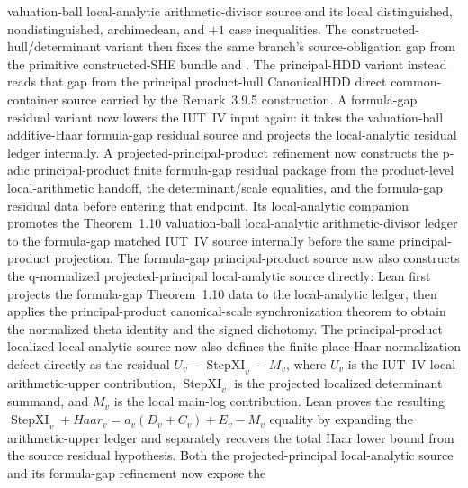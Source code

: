 \documentclass[11pt]{article}
\newcommand{\IUT}{IUT}
\theoremstyle{plain}
\theoremstyle{definition}
\theoremstyle{remark}
\begin{document}
valuation-ball local-analytic arithmetic-divisor source and its local
distinguished, nondistinguished, archimedean, and \(+1\) case inequalities.
The constructed-hull/determinant variant
\texttt{}
then fixes the same branch's source-obligation gap from the primitive
constructed-SHE bundle and
\texttt{}.
The principal-HDD variant
\texttt{}
instead reads that gap from the principal product-hull CanonicalHDD direct
common-container source carried by the Remark~3.9.5 construction.
A formula-gap residual variant now lowers the IUT~IV input again: it takes the
valuation-ball additive-Haar formula-gap residual source and projects the
local-analytic residual ledger internally.
A projected-principal-product refinement now constructs the p-adic
principal-product finite formula-gap residual package from the product-level
local-arithmetic handoff, the determinant/scale equalities, and the
formula-gap residual data before entering that endpoint.
Its local-analytic companion promotes the Theorem~1.10 valuation-ball
local-analytic arithmetic-divisor ledger to the formula-gap matched
\IUT{}~IV source internally before the same principal-product projection.
The formula-gap principal-product source now also constructs the q-normalized
projected-principal local-analytic source directly: Lean first projects the
formula-gap Theorem~1.10 data to the local-analytic ledger, then applies the
principal-product canonical-scale synchronization theorem to obtain the
normalized theta identity and the signed dichotomy.
The principal-product localized local-analytic source now also defines the
finite-place Haar-normalization defect directly as the residual
\(U_v-\operatorname{StepXI}_v-M_v\), where \(U_v\) is the \IUT{}~IV local
arithmetic-upper contribution, \(\operatorname{StepXI}_v\) is the projected
localized determinant summand, and \(M_v\) is the local main-log contribution.
Lean proves the resulting
\(\operatorname{StepXI}_v+Haar_v=a_v(D_v+C_v)+E_v-M_v\) equality by expanding
the arithmetic-upper ledger and separately recovers the total Haar lower bound
from the source residual hypothesis.  Both the projected-principal
local-analytic source and its formula-gap refinement now expose the
\end{document}
